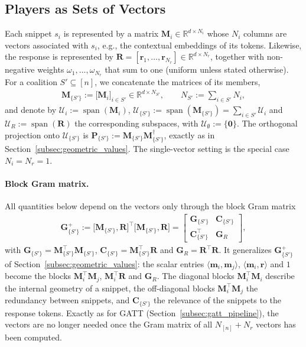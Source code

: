 \documentclass{article}
\begin{document}
\subsection{Players as Sets of Vectors}
\label{subsec:set_notation}

Each snippet $s_i$ is represented by a matrix $\mathbf{M}_i \in \mathbb{R}^{d \times N_i}$ whose $N_i$ columns are vectors associated with $s_i$, e.g., the contextual embeddings of its tokens. Likewise, the response is represented by $\mathbf{R} = [\mathbf{r}_1, \dots, \mathbf{r}_{N_r}] \in \mathbb{R}^{d \times N_r}$, together with non-negative weights $\omega_1, \dots, \omega_{N_r}$ that sum to one (uniform unless stated otherwise). For a coalition $S' \subseteq [n]$, we concatenate the matrices of its members,
\begin{align}
    \mathbf{M}_{\{S'\}} := \big[\mathbf{M}_i\big]_{i \in S'} \in \mathbb{R}^{d \times N_{S'}}, \qquad N_{S'} := \sum_{i \in S'} N_i,
\end{align}
and denote by $\mathcal{U}_i := \operatorname{span}(\mathbf{M}_i)$, $\mathcal{U}_{\{S'\}} := \operatorname{span}(\mathbf{M}_{\{S'\}}) = \sum_{i \in S'} \mathcal{U}_i$ and $\mathcal{U}_R := \operatorname{span}(\mathbf{R})$ the corresponding subspaces, with $\mathcal{U}_{\emptyset} := \{\mathbf{0}\}$. The orthogonal projection onto $\mathcal{U}_{\{S'\}}$ is $\mathbf{P}_{\{S'\}} := \mathbf{M}_{\{S'\}} \mathbf{M}_{\{S'\}}^{\dagger}$, exactly as in Section~\ref{subsec:geometric_values}. The single-vector setting is the special case $N_i = N_r = 1$.

\paragraph{Block Gram matrix.}
All quantities below depend on the vectors only through the block Gram matrix
\begin{align}\label{eq:set_gram}
    \mathbf{G}^{+}_{\{S'\}} := \big[\mathbf{M}_{\{S'\}}, \mathbf{R}\big]^\top \big[\mathbf{M}_{\{S'\}}, \mathbf{R}\big] =
    \begin{bmatrix}
        \mathbf{G}_{\{S'\}} & \mathbf{C}_{\{S'\}} \\
        \mathbf{C}_{\{S'\}}^\top & \mathbf{G}_{R}
    \end{bmatrix},
\end{align}
with $\mathbf{G}_{\{S'\}} = \mathbf{M}_{\{S'\}}^\top \mathbf{M}_{\{S'\}}$, $\mathbf{C}_{\{S'\}} = \mathbf{M}_{\{S'\}}^\top \mathbf{R}$ and $\mathbf{G}_{R} = \mathbf{R}^\top \mathbf{R}$.
It generalizes $\mathbf{G}^{+}_{\{S'\}}$ of Section~\ref{subsec:geometric_values}: the scalar entries $\langle \mathbf{m}_i, \mathbf{m}_j \rangle$, $\langle \mathbf{m}_i, \mathbf{r} \rangle$ and $1$ become the blocks $\mathbf{M}_i^\top \mathbf{M}_j$, $\mathbf{M}_i^\top \mathbf{R}$ and $\mathbf{G}_R$. The diagonal blocks $\mathbf{M}_i^\top \mathbf{M}_i$ describe the internal geometry of a snippet, the off-diagonal blocks $\mathbf{M}_i^\top \mathbf{M}_j$ the redundancy between snippets, and $\mathbf{C}_{\{S'\}}$ the relevance of the snippets to the response tokens. Exactly as for GATT (Section~\ref{subsec:gatt_pipeline}), the vectors are no longer needed once the Gram matrix of all $N_{[n]} + N_r$ vectors has been computed.
\end{document}
